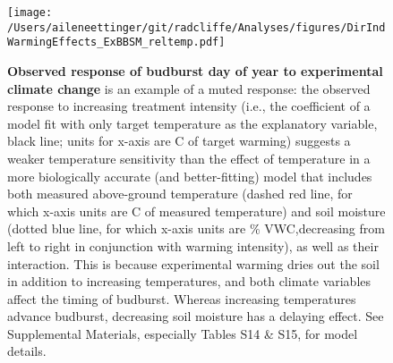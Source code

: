\documentclass{article}
\begin{document}
\begin{figure}[h]
 \texttt{[image: /Users/aileneettinger/git/radcliffe/Analyses/figures/DirIndWarmingEffects\_ExBBSM\_reltemp.pdf]} 
 \caption{\textbf{Observed response of budburst day of year to experimental climate change} is an example of a muted response: the observed response to increasing treatment intensity (i.e., the coefficient of a model fit with only target temperature as the explanatory variable, black line; units for x-axis are \degree C of target warming) suggests a weaker temperature sensitivity than the effect of temperature in a more biologically accurate (and better-fitting) model that includes both measured above-ground temperature (dashed red line, for which x-axis units are \degree C of measured temperature)  and soil moisture (dotted blue line, for which x-axis units are \% VWC,decreasing from left to right in conjunction with warming intensity), as well as their interaction. This is because experimental warming dries out the soil in addition to increasing temperatures, and both climate variables affect the timing of budburst. Whereas increasing temperatures advance budburst, decreasing soil moisture has a delaying effect. See Supplemental Materials, especially Tables S14 \& S15, for model details.} 
 
\label{fig:phen}
\end{figure}
  
\end{document}
